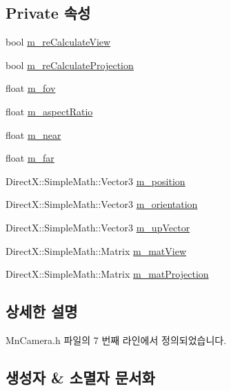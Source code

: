\subsection*{Private 속성}
\begin{DoxyCompactItemize}
\item 
bool \hyperlink{class_m_n_l_1_1_mn_camera_a84a4810d902a48aa0b123bdd0dc5e6f5}{m\+\_\+re\+Calculate\+View}
\item 
bool \hyperlink{class_m_n_l_1_1_mn_camera_abad8116c842d5680d3c545aa20452cbe}{m\+\_\+re\+Calculate\+Projection}
\item 
float \hyperlink{class_m_n_l_1_1_mn_camera_a953e98334e299bb5231c12725426e9e1}{m\+\_\+fov}
\item 
float \hyperlink{class_m_n_l_1_1_mn_camera_a8b651cf5f971172916403ea79c0a553f}{m\+\_\+aspect\+Ratio}
\item 
float \hyperlink{class_m_n_l_1_1_mn_camera_a91e640f0f4ca4c834d1412befcbc54c2}{m\+\_\+near}
\item 
float \hyperlink{class_m_n_l_1_1_mn_camera_aba7e7ba5a457118a27f51b4e1d215e6d}{m\+\_\+far}
\item 
Direct\+X\+::\+Simple\+Math\+::\+Vector3 \hyperlink{class_m_n_l_1_1_mn_camera_aea21f690e7007b7ea8b4c2348e81e421}{m\+\_\+position}
\item 
Direct\+X\+::\+Simple\+Math\+::\+Vector3 \hyperlink{class_m_n_l_1_1_mn_camera_a329c94f5c273c0d53522663678889f1e}{m\+\_\+orientation}
\item 
Direct\+X\+::\+Simple\+Math\+::\+Vector3 \hyperlink{class_m_n_l_1_1_mn_camera_ab1138f925c50ceea63bf0d510d8df0d0}{m\+\_\+up\+Vector}
\item 
Direct\+X\+::\+Simple\+Math\+::\+Matrix \hyperlink{class_m_n_l_1_1_mn_camera_ac4717e21e16d9d3007e788fbe2e299de}{m\+\_\+mat\+View}
\item 
Direct\+X\+::\+Simple\+Math\+::\+Matrix \hyperlink{class_m_n_l_1_1_mn_camera_a2fe67aae96095cd1c54ab1e9f71e06f7}{m\+\_\+mat\+Projection}
\end{DoxyCompactItemize}


\subsection{상세한 설명}


Mn\+Camera.\+h 파일의 7 번째 라인에서 정의되었습니다.



\subsection{생성자 \& 소멸자 문서화}
\mbox{\label{class_m_n_l_1_1_mn_camera_aff0b3d9da025157410805fc0c2e3659f}} 
